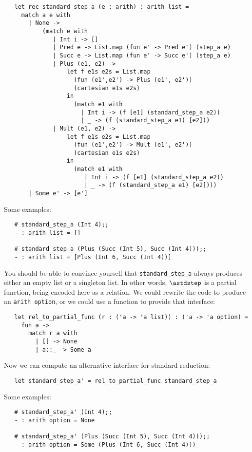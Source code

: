 \begin{verbatim}
   let rec standard_step_a (e : arith) : arith list =
     match a e with
       | None ->
           (match e with
              | Int i -> []
              | Pred e -> List.map (fun e' -> Pred e') (step_a e)
              | Succ e -> List.map (fun e' -> Succ e') (step_a e)
              | Plus (e1, e2) ->
                  let f e1s e2s = List.map
                    (fun (e1',e2') -> Plus (e1', e2'))
                    (cartesian e1s e2s)
                  in
                    (match e1 with
                      | Int i -> (f [e1] (standard_step_a e2))
                      | _ -> (f (standard_step_a e1) [e2]))
              | Mult (e1, e2) ->
                  let f e1s e2s = List.map
                    (fun (e1',e2') -> Mult (e1', e2'))
                    (cartesian e1s e2s)
                  in
                    (match e1 with
                       | Int i -> (f [e1] (standard_step_a e2))
                       | _ -> (f (standard_step_a e1) [e2])))
       | Some e' -> [e']
\end{verbatim}

Some examples:
\begin{verbatim}
   # standard_step_a (Int 4);;
   - : arith list = []

   # standard_step_a (Plus (Succ (Int 5), Succ (Int 4)));;
   - : arith list = [Plus (Int 6, Succ (Int 4))]
\end{verbatim}

You should be able to convince yourself that {\tt standard\_step\_a}
always produces either an empty list or a singleton list.  In other
words, $\astdstep$ is a partial function, being encoded here as a
relation.  We could rewrite the code to produce an {\tt arith option},
or we could use a function to provide that interface:
\begin{verbatim}
   let rel_to_partial_func (r : ('a -> 'a list)) : ('a -> 'a option) =
     fun a ->
       match r a with
         | [] -> None
         | a::_ -> Some a
\end{verbatim}

Now we can compute an alternative interface for standard reduction:
\begin{verbatim}
   let standard_step_a' = rel_to_partial_func standard_step_a
\end{verbatim}

Some examples:
\begin{verbatim}
   # standard_step_a' (Int 4);;
   - : arith option = None

   # standard_step_a' (Plus (Succ (Int 5), Succ (Int 4)));;
   - : arith option = Some (Plus (Int 6, Succ (Int 4)))
\end{verbatim}



